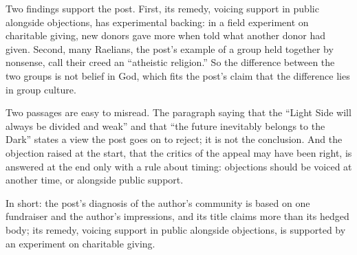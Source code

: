 \begin{afterword}
Two findings support the post. First, its remedy, voicing support in public alongside objections, has experimental backing: in a field experiment on charitable giving, new donors gave more when told what another donor had given. Second, many Raelians, the post's example of a group held together by nonsense, call their creed an ``atheistic religion.'' So the difference between the two groups is not belief in God, which fits the post's claim that the difference lies in group culture.

Two passages are easy to misread. The paragraph saying that the ``Light Side will always be divided and weak'' and that ``the future inevitably belongs to the Dark'' states a view the post goes on to reject; it is not the conclusion. And the objection raised at the start, that the critics of the appeal may have been right, is answered at the end only with a rule about timing: objections should be voiced at another time, or alongside public support.

In short: the post's diagnosis of the author's community is based on one fundraiser and the author's impressions, and its title claims more than its hedged body; its remedy, voicing support in public alongside objections, is supported by an experiment on charitable giving.
\end{afterword}
